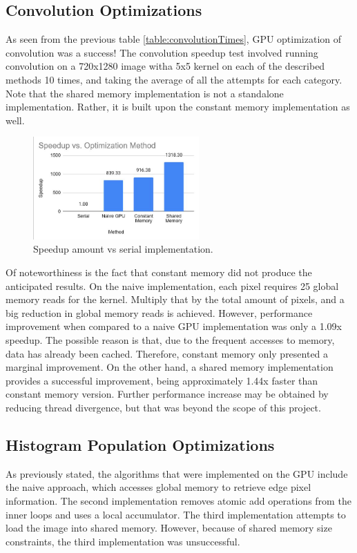 \documentclass[12pt]{article}
\begin{document}
\subsection{Convolution Optimizations}

As seen from the previous table \autoref{table:convolutionTimes}, GPU optimization of convolution was a success! The convolution speedup test involved running convolution on a 720x1280 image witha 5x5 kernel on each of the described methods 10 times, and taking the average of all the attempts for each category. Note that the shared memory implementation is not a standalone implementation. Rather, it is built upon the constant memory implementation as well. 
\begin{figure}[h]
\centering
\includegraphics[width=2.5in]{figures/ConvolutionSpeedup}\caption{Speedup amount vs serial implementation.}\label{figure:convolution-speedup}
\end{figure}
Of noteworthiness is the fact that constant memory did not produce the anticipated results. On the naive implementation, each pixel requires 25 global memory reads for the kernel. Multiply that by the total amount of pixels, and a big reduction in global memory reads is achieved. However, performance improvement when compared to a naive GPU implementation was only a 1.09x speedup. The possible reason is that, due to the frequent accesses to memory, data has already been cached. Therefore, constant memory only presented a marginal improvement. 
On the other hand, a shared memory implementation provides a successful improvement, being approximately 1.44x faster than constant memory version. Further performance increase may be obtained by reducing thread divergence, but that was beyond the scope of this project.

\subsection{Histogram Population Optimizations}
As previously stated, the algorithms that were implemented on the GPU include the naive approach, which accesses global memory to retrieve edge pixel information.
The second implementation removes atomic add operations from the inner loops and uses a local accumulator.
The third implementation attempts to load the image into shared memory. However, because of shared memory size constraints, the third implementation was unsuccessful.
\end{document}
